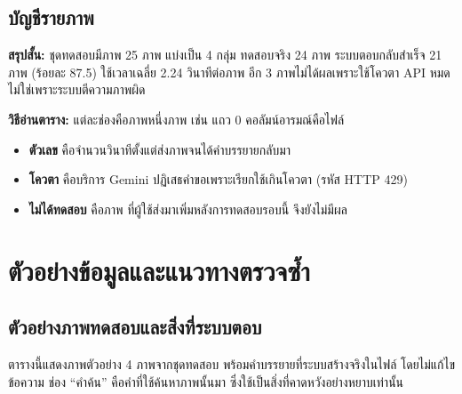 \section{บัญชีรายภาพ}
\textbf{สรุปสั้น:} ชุดทดสอบมีภาพ 25 ภาพ แบ่งเป็น 4 กลุ่ม ทดสอบจริง 24 ภาพ ระบบตอบกลับสำเร็จ 21 ภาพ (ร้อยละ 87.5) ใช้เวลาเฉลี่ย 2.24 วินาทีต่อภาพ อีก 3 ภาพไม่ได้ผลเพราะใช้โควตา API หมด ไม่ใช่เพราะระบบตีความภาพผิด

\textbf{วิธีอ่านตาราง:} แต่ละช่องคือภาพหนึ่งภาพ เช่น แถว 0 คอลัมน์อารมณ์คือไฟล์ 
\begin{itemize}
\item \textbf{ตัวเลข} คือจำนวนวินาทีตั้งแต่ส่งภาพจนได้คำบรรยายกลับมา
\item \textbf{ โควตา} คือบริการ Gemini ปฏิเสธคำขอเพราะเรียกใช้เกินโควตา (รหัส HTTP 429)
\item \textbf{ไม่ได้ทดสอบ} คือภาพ  ที่ผู้ใช้ส่งมาเพิ่มหลังการทดสอบรอบนี้ จึงยังไม่มีผล
\end{itemize}


\chapter{ตัวอย่างข้อมูลและแนวทางตรวจซ้ำ}
\section{ตัวอย่างภาพทดสอบและสิ่งที่ระบบตอบ}
ตารางนี้แสดงภาพตัวอย่าง 4 ภาพจากชุดทดสอบ พร้อมคำบรรยายที่ระบบสร้างจริงในไฟล์  โดยไม่แก้ไขข้อความ ช่อง ``คำค้น'' คือคำที่ใช้ค้นหาภาพนั้นมา ซึ่งใช้เป็นสิ่งที่คาดหวังอย่างหยาบเท่านั้น

